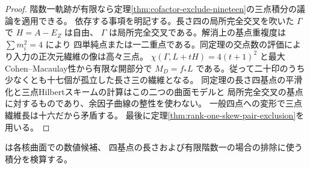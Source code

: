 \begin{proof}
階数一軌跡が有限なら定理\ref{thm:cofactor-exclude-nineteen}の三点積分の議論を適用できる。
依存する事項を明記する。長さ四の局所完全交叉を吹いた $\Gamma$ で $H=A-E_Z$ は自由、
$\Gamma$ は局所完全交叉である。解消上の基点重複度は $\sum m_i^2=4$ により
四単純点または一二重点である。同定理の交点数の評価により入力の正次元繊維の像は高々三点。
$\chi(\Gamma,L+tH)=4(t+1)^2$ と最大Cohen--Macaulay性から有限な開部分で
$M_D=f_*L$ である。従って二十印のうち少なくとも十七個が孤立した長さ三の繊維となる。
同定理の長さ四基点の平滑化と三点Hilbertスキームの計算はこの二つの曲面モデルと
局所完全交叉の基点に対するものであり、余因子曲線の整性を使わない。
一般四点への変形で三点繊維長は十六だから矛盾する。
最後に定理\ref{thm:rank-one-skew-pair-exclusion}を用いる。
\end{proof}
 は各核曲面での数値候補、
四基点の長さおよび有限階数一の場合の排除に使う積分を検算する。
